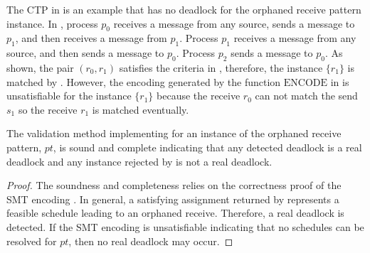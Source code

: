 \examplefigtwo

The CTP in  is an example that has no deadlock for the orphaned receive pattern instance. In , process $p_0$ receives a message from any source, sends a message to $p_1$, and then receives a message from $p_1$. Process $p_1$ receives a message from any source, and then sends a message to $p_0$. Process $p_2$ sends a message to $p_0$. As shown, the pair $(r_0,r_1)$ satisfies the criteria in , therefore, the instance $\{r_1\}$ is matched by . However, the encoding generated by the function $\mathrm{ENCODE}$ in  is unsatisfiable for the instance $\{r_1\}$ because the receive $r_0$ can not match the send $s_1$ so the receive $r_1$ is matched eventually.


\begin{lemma}
The validation method implementing  for an instance of the orphaned receive pattern, $\mathit{pt}$, is sound and complete indicating that any detected deadlock is a real deadlock and any instance rejected by  is not a real deadlock. 
\label{lemma:mismatch}
\end{lemma}
\begin{proof}
The soundness and completeness relies on the correctness proof of the SMT encoding \cite{DBLP:conf/kbse/HuangMM13}. In general, a satisfying assignment returned by  represents a feasible schedule leading to an orphaned receive. Therefore, a real deadlock is detected. If the SMT encoding is unsatisfiable indicating that no schedules can be resolved for $pt$, then no real deadlock may occur.
\end{proof}




